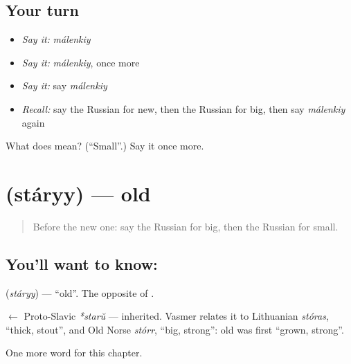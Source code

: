 \subsection*{Your turn}
\begin{itemize}
\raggedright
  \item \emph{Say it:} \emph{málenkiy}
  \item \emph{Say it:} \emph{málenkiy}, once more
  \item \emph{Say it:} say \emph{málenkiy}
  \item \emph{Recall:} say the Russian for new, then the Russian for big, then say \emph{málenkiy} again
\end{itemize}

\begin{tcolorbox}[breakable,colback=teal!4,colframe=teal!35!black,title={Before you move on}]
What does  mean? (\textquotedblleft{}Small\textquotedblright{}.) Say it once more.
\end{tcolorbox}
\section[\texorpdfstring{\ru{старый} (stáryy)}{старый (stáryy)}]{ (stáryy) — old}

\label{lesson:RU-C65-old}



\begin{quote}
Before the new one: say the Russian for big, then the Russian for small.
\end{quote}

\subsection*{You'll want to know: }
\textbf{} (\emph{stáryy}) — \textquotedblleft{}old\textquotedblright{}. The opposite of \textbf{}.

\begin{cousinweb}
\textbf{} $\leftarrow$ Proto-Slavic \emph{*starŭ} — inherited. Vasmer relates it to Lithuanian \emph{stóras}, \textquotedblleft{}thick, stout\textquotedblright{}, and Old Norse \emph{stórr}, \textquotedblleft{}big, strong\textquotedblright{}: old was first \textquotedblleft{}grown, strong\textquotedblright{}.
\end{cousinweb}

\begin{grammarlens}[title={What you've built}]
One more word for this chapter.
\end{grammarlens}

